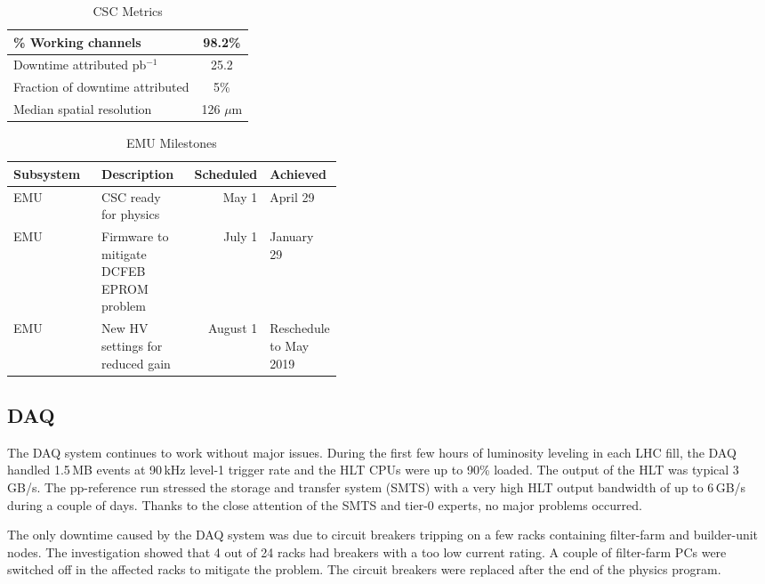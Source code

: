 \documentclass[12pt]{article}
\begin{document}
\begin{table}[htp]
\caption{CSC Metrics}
\begin{center}
\begin{tabular}{|l|c|}
\hline
 \% Working channels & 98.2\%  \\
\hline
Downtime attributed pb$^{-1}$ & 25.2 \\
Fraction of downtime attributed& 5\% \\
\hline
Median spatial resolution &  126 $\mu$m \\
\hline
\end{tabular}
\end{center}
\label{CSCMetrics}
\end{table}%



 \begin{table}[htp]
\caption{EMU Milestones}
\begin{center}
\def\arraystretch{1.5}

\begin{tabular}{|l|p{0.25\linewidth}|r|p{0.18\linewidth}|}
\hline
Subsystem&Description&Scheduled&Achieved\\
\hline
EMU& \raggedright{CSC ready for physics}& May 1& April 29 \\
\hline
EMU& \raggedright{Firmware to mitigate DCFEB EPROM problem} &July 1 &January 29\\ 
\hline
EMU & New HV settings for reduced gain &August 1 & Reschedule to May 2019 \\
\hline
\end{tabular}
\end{center}
\label{EMUMilestones}
\end{table}%


\subsection{DAQ}
The DAQ system continues to work without major issues. During the first few hours of luminosity leveling in each LHC fill, the DAQ handled 1.5\,MB events at 90\,kHz level-1 trigger rate and the HLT CPUs were up to 90\% loaded. The output of the HLT was typical 3\,GB/s. The pp-reference run stressed the storage and transfer system (SMTS) with a very high HLT output bandwidth of up to 6\,GB/s during a couple of days. Thanks to the close attention of the SMTS and tier-0 experts, no major problems occurred.

The only downtime caused by the DAQ system was due to circuit breakers tripping on a few racks containing filter-farm and builder-unit nodes. The investigation showed that 4 out of 24 racks had breakers with a too low current rating. A couple of filter-farm PCs were switched off in the affected racks to mitigate the problem. The circuit breakers were replaced after the end of the physics program.
\end{document}
